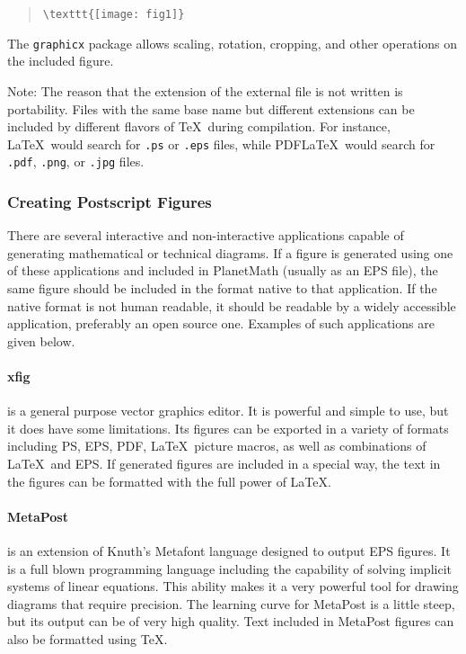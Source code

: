 \begin{quote}
\begin{verbatim}
\texttt{[image: fig1]}
\end{verbatim}
\end{quote}

The \texttt{graphicx} package allows scaling, rotation, cropping,
and other operations on the included figure.

Note: The reason that the
extension of the external file is not written is portability. Files
with the same base name but different extensions can be included by
different flavors of \TeX\ during compilation. For instance, \LaTeX\
would search for \verb|.ps| or \verb|.eps| files, while PDF\LaTeX\ would
search for \verb|.pdf|, \verb|.png|, or \verb|.jpg| files.



\subsubsection{Creating Postscript Figures}
There are several interactive and non-interactive applications capable
of generating mathematical or technical diagrams. If a figure is
generated using one of these applications and included in PlanetMath
(usually as an EPS file), the same figure should be included in the
format native to that application. If the native format is not human
readable, it should be readable by a widely accessible application,
preferably an open source one. Examples of such applications are given
below.

\paragraph{xfig}
 is a general purpose vector graphics editor. It is powerful and
simple to use, but it does have some limitations. Its figures can be
exported in a variety of formats including PS, EPS, PDF, \LaTeX\ picture
macros, as well as combinations of \LaTeX\ and EPS. If generated figures
are included in a special way, the text in the figures can be formatted
with the full power of \LaTeX.

\paragraph{MetaPost}
is an extension of Knuth's Metafont language designed to output
EPS figures. It is a full blown programming language including the
capability of solving implicit systems of linear equations. This ability
makes it a very powerful tool for drawing diagrams that require
precision. The learning curve for MetaPost is a little steep, but its
output can be of very high quality. Text included in MetaPost figures
can also be formatted using \TeX.

